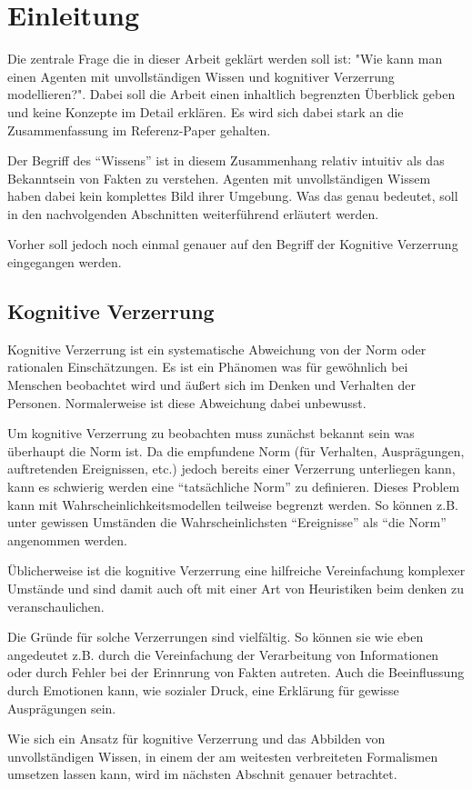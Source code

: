 \chapter{Einleitung}
\label{introduction}
Die zentrale Frage die in dieser Arbeit geklärt werden soll ist: "Wie kann man einen Agenten mit unvollständigen Wissen und kognitiver Verzerrung modellieren?". 
Dabei soll die Arbeit einen inhaltlich begrenzten Überblick geben und keine Konzepte im Detail erklären. Es wird sich dabei stark an die Zusammenfassung im Referenz-Paper \cite{balke2014agents} gehalten.

Der Begriff des \enquote{Wissens} ist in diesem Zusammenhang relativ intuitiv als das Bekanntsein von Fakten zu verstehen.
Agenten mit unvollständigen Wissem haben dabei kein komplettes Bild ihrer Umgebung.
Was das genau bedeutet, soll in den nachvolgenden Abschnitten weiterführend erläutert werden.

Vorher soll jedoch noch einmal genauer auf den Begriff der Kognitive Verzerrung eingegangen werden.

\section{Kognitive Verzerrung}
Kognitive Verzerrung ist ein systematische Abweichung von der Norm oder rationalen Einschätzungen\cite{}. 
Es ist ein Phänomen was für gewöhnlich bei Menschen beobachtet wird und äußert sich im Denken und Verhalten der Personen.
Normalerweise ist diese Abweichung dabei unbewusst.

Um kognitive Verzerrung zu beobachten muss zunächst bekannt sein was überhaupt die Norm ist.
Da die empfundene Norm (für Verhalten, Ausprägungen, auftretenden Ereignissen, etc.) jedoch bereits einer Verzerrung unterliegen kann, kann es schwierig werden eine \enquote{tatsächliche Norm} zu definieren. 
Dieses Problem kann mit Wahrscheinlichkeitsmodellen teilweise begrenzt werden. 
So können z.B. unter gewissen Umständen die Wahrscheinlichsten \enquote{Ereignisse} als \enquote{die Norm} angenommen werden.

Üblicherweise ist die kognitive Verzerrung eine hilfreiche Vereinfachung komplexer Umstände und sind damit auch oft mit einer Art von Heuristiken beim denken zu veranschaulichen.

Die Gründe für solche Verzerrungen sind vielfältig.
So können sie wie eben angedeutet z.B. durch die Vereinfachung der Verarbeitung von Informationen oder durch Fehler bei der Erinnrung von Fakten autreten.
Auch die Beeinflussung durch Emotionen kann, wie sozialer Druck, eine Erklärung für gewisse Ausprägungen sein.

Wie sich ein Ansatz für kognitive Verzerrung und das Abbilden von unvollständigen Wissen, in einem der am weitesten verbreiteten Formalismen umsetzen lassen kann, wird im nächsten Abschnit genauer betrachtet.